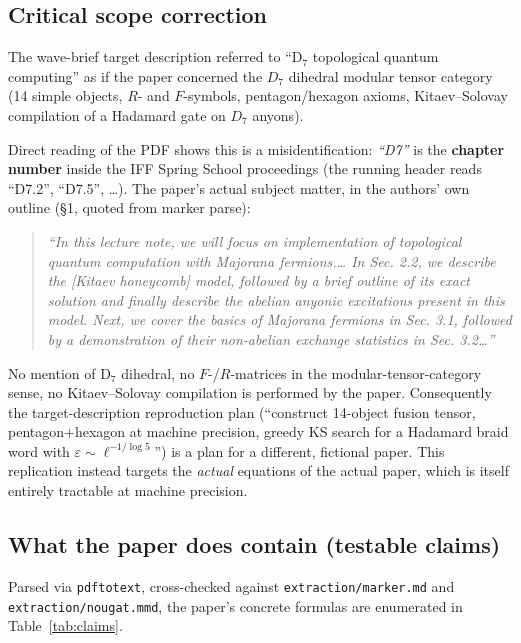 \documentclass[11pt]{article}
\begin{document}
\subsection{Critical scope correction}
The wave-brief target description referred to ``D$_7$ topological quantum computing'' as if the paper concerned the $D_7$ dihedral modular tensor category (14 simple objects, $R$- and $F$-symbols, pentagon/hexagon axioms, Kitaev--Solovay compilation of a Hadamard gate on $D_7$ anyons).

Direct reading of the PDF shows this is a misidentification: \emph{``D7''} is the \textbf{chapter number} inside the IFF Spring School proceedings (the running header reads ``D7.2'', ``D7.5'', \ldots{}). The paper's actual subject matter, in the authors' own outline (\S1, quoted from marker parse):
\begin{quote}\small
\emph{``In this lecture note, we will focus on implementation of topological quantum computation with Majorana fermions.\ldots{} In Sec. 2.2, we describe the [Kitaev honeycomb] model, followed by a brief outline of its exact solution and finally describe the abelian anyonic excitations present in this model. Next, we cover the basics of Majorana fermions in Sec. 3.1, followed by a demonstration of their non-abelian exchange statistics in Sec. 3.2\ldots{}''}
\end{quote}
No mention of D$_7$ dihedral, no $F$-/$R$-matrices in the modular-tensor-category sense, no Kitaev--Solovay compilation is performed by the paper. Consequently the target-description reproduction plan (``construct 14-object fusion tensor, pentagon+hexagon at machine precision, greedy KS search for a Hadamard braid word with $\varepsilon\sim\ell^{-1/\log 5}$'') is a plan for a different, fictional paper. This replication instead targets the \emph{actual} equations of the actual paper, which is itself entirely tractable at machine precision.

\subsection{What the paper does contain (testable claims)}
Parsed via \texttt{pdftotext}, cross-checked against \texttt{extraction/marker.md} and \texttt{extraction/nougat.mmd}, the paper's concrete formulas are enumerated in Table~\ref{tab:claims}.
\end{document}
